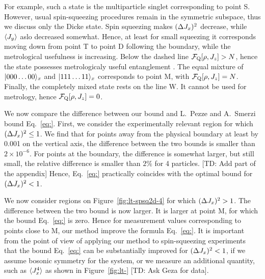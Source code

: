 For example, such a state is the multiparticle singlet corresponding to point S.
However, usual spin-squeezing procedures remain in the symmetric subspace, thus we discuss only the Dicke state.
Spin squeezing makes $(\Delta J_x )^2$ decrease, while $\langle J_y \rangle$ aslo decreased somewhat.
Hence, at least for small squeezing it corresponds moving down from point T to point D following the boundary, while the metrological usefulness is increasing.
Below the dashed line $\mathcal{F}_{\textnormal{Q}}[\rho,J_z]>N$, hence the state possesses metrologicaly useful entanglement \citep{}.
The equal mixture of $\vert 000\dots00 \rangle_x$ and $\vert 111\dots11 \rangle_x$ corresponds to point M, with $\mathcal{F}_{\textnormal{Q}}[\rho,J_z] = N$.
Finally, the completely mixed state rests on the line W.
It cannot be used for metrology, hence $\mathcal{F}_{\textnormal{Q}}[\rho,J_z]=0$.

We now compare the difference between our bound and L.~Pezze and A.~Smerzi bound Eq.~\eqref{eq:}.
First, we consider the experimentally relevant region for which $(\Delta J_x )^2\leq 1$.
We find that for points away from the physical boundary at least by 0.001 on the vertical axis, the difference between the two bounds is smaller than $2\times10^{-6}$.
For points at the boundary, the difference is somewhat larger, but still small, the relative difference is smaller than $2\%$ for 4 particles.
[TD: Add part of the appendix]
Hence, Eq.~\eqref{eq:} practically coincides with the optimal bound for $(\Delta J_x )^2<1$.

We now consider regions on Figure~\ref{fig:lt-spsq2d-4} for which $(\Delta J_x )^2>1$.
The difference between the two bound is now larger.
It is larger at point M, for which the bound Eq.~\eqref{eq:} is zero.
Hence for measurement values corresponding to points close to M, our method improve the formula Eq.~\eqref{eq:}.
It is important from the point of view of applying our method to spin-squeezing experiments that the bound Eq.~\eqref{eq:} can be substantially improved for $(\Delta J_x )^2<1$, if we assume bosonic symmetry for the system, or we measure an additional quantity, such as $\langle J_x^4 \rangle$ as shown in Figure~\ref{fig:lt-} [TD: Ask Geza for data].

